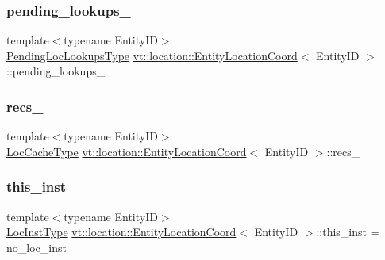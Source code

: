 \subsubsection{\texorpdfstring{pending\+\_\+lookups\+\_\+}{pending\_lookups\_}}
{\footnotesize\ttfamily template$<$typename Entity\+ID$>$ \\
\hyperlink{structvt_1_1location_1_1_entity_location_coord_a495c5dfc3aa444524af9aede4b20cfdc}{Pending\+Loc\+Lookups\+Type} \hyperlink{structvt_1_1location_1_1_entity_location_coord}{vt\+::location\+::\+Entity\+Location\+Coord}$<$ Entity\+ID $>$\+::pending\+\_\+lookups\+\_\+\hspace{0.3cm}{\ttfamily [private]}}

\mbox{\label{structvt_1_1location_1_1_entity_location_coord_a4822f7d8be8fd72319ad7a1823cf5fc9}} 
\subsubsection{\texorpdfstring{recs\+\_\+}{recs\_}}
{\footnotesize\ttfamily template$<$typename Entity\+ID$>$ \\
\hyperlink{structvt_1_1location_1_1_entity_location_coord_a8824e120b11c3234534a6dce11fe0c69}{Loc\+Cache\+Type} \hyperlink{structvt_1_1location_1_1_entity_location_coord}{vt\+::location\+::\+Entity\+Location\+Coord}$<$ Entity\+ID $>$\+::recs\+\_\+\hspace{0.3cm}{\ttfamily [private]}}

\mbox{\label{structvt_1_1location_1_1_entity_location_coord_ade191f7cf6aba682f960abef1ddab9fc}} 
\subsubsection{\texorpdfstring{this\+\_\+inst}{this\_inst}}
{\footnotesize\ttfamily template$<$typename Entity\+ID$>$ \\
\hyperlink{namespacevt_1_1location_a4db6456e8024af2d23fc5ae560fef866}{Loc\+Inst\+Type} \hyperlink{structvt_1_1location_1_1_entity_location_coord}{vt\+::location\+::\+Entity\+Location\+Coord}$<$ Entity\+ID $>$\+::this\+\_\+inst = no\+\_\+loc\+\_\+inst\hspace{0.3cm}{\ttfamily [private]}}



